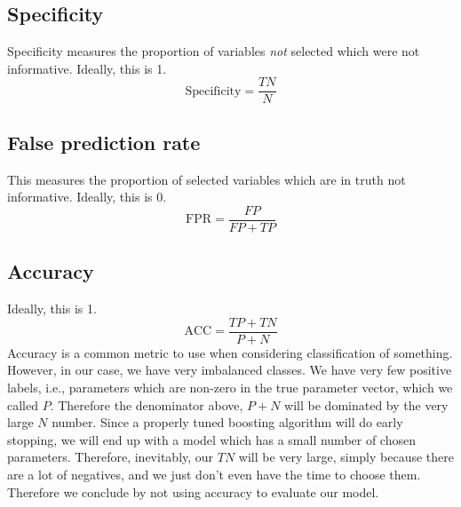 \subsection{Specificity}
Specificity measures the proportion of variables \textit{not} selected which were not informative.
Ideally, this is 1.
\begin{equation}\label{eq:specificity}
    \text{Specificity}=\frac{TN}{N}
\end{equation}

\subsection{False prediction rate}
This measures the proportion of selected variables which are in truth not informative.
Ideally, this is 0.
\begin{equation}\label{eq:accuracy}
    \text{FPR}=\frac{FP}{FP+TP}
\end{equation}


\subsection{Accuracy}
Ideally, this is 1.
\begin{equation}\label{eq:accuracy}
    \text{ACC}=\frac{TP+TN}{P+N}
\end{equation}
Accuracy is a common metric to use when considering classification of something. However, in our case, we have very imbalanced classes. We have very few positive labels, i.e., parameters which are non-zero in the true parameter vector, which we called $P$. Therefore the denominator above, $P+N$ will be dominated by the very large $N$ number. Since a properly tuned boosting algorithm will do early stopping, we will end up with a model which has a small number of chosen parameters. Therefore, inevitably, our $TN$ will be very large, simply because there are a lot of negatives, and we just don't even have the time to choose them. Therefore we conclude by not using accuracy to evaluate our model.

